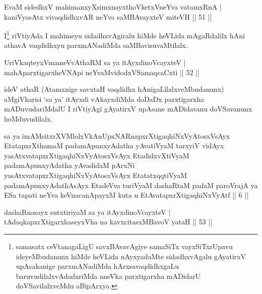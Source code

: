 \begin{shl}
EvaM sidedhxV mahimanxyXsimxnayxthoVketxVneYva vatamxRnA | \\
kaniVyasAtx vivaqdidhxvAR neYva saMBAvayxteV miteVH \hfill ||  51 || 
\end{shl}

\begin{artha} 
I\footnote{samasatx ceVtanagaLigU savxBAvavAgiye samaSiTx 
vayxSiTxrUpavu ideyeMbudanunx hiMde heVLida nAyxyadaMte sidadhxvAgalu 
gAyatirxV upAsakanige parxmANadiMda hArxsavaqdidhxgaLu 
baruvudilalxvAdadxriMda aneVka parxtigarxha mADidarU doVSavilalxveMdu 
aBipArxya.} riVtiyAda I mahimeyu sidadhxvAgiralu hiMde heVLida 
mAgaRdalilx hAni athavA vaqdidhxyu parxmANadiMda saMBavisuvaMtilalx.
\end{artha}


\begin{shl}
UriVkaqteyxVmameVvAthaRM sa ya itAyxdinoVcayxteV | \\
mahAparxtigarxheVNApi neYvaMvidodxVSamaqcaCxti \hfill ||  52 || 
\end{shl}

\begin{artha} 
ideV athaR (Atamxnige savxtaH vaqdidhx hAnigaLilalxveMbudanunx) 
aMgiVkarisi `sa ya' itAyxdi vAkayxdiMda doDaDx parxtigarxha 
mADuvudariMdalU I riVtiyAgi gAyatirxV upAsane mADidavanu doVSavanunx 
hoMduvudilalx. 
\end{artha}

\begin{kandikeshl}
sa ya imAMsitxrXVMlolxVkAnUpxNARnapxrXtigaqhiNxVyAtosxV\s sAyx EtatapxrXthamaM padamApunxyAdatha yAvatiVyaM tarxyiV vidAyx yasAtxvatapxrXtigaqhiNxVyAtosxV\s sAyx EtadidxvXtiVyaM padamApunxyAdatha yAvadidaM pArxNi yasAtxvatapxrXtigaqhiNxVyAtosxV\s sAyx EtatatxqqtiVyaM padamApunxyAdathAsAyx EtadeVva turiVyaM dashaRtaM padaM paroVrajA ya ESa tapati neYva keVnacanApayxM kuta u EtAvatapxrXtigaqhiNxVyAtf || 6 ||
\end{kandikeshl}

\begin{shl}
dashaRnasayx sutxtiriyaM sa ya itAyxdinoVcayxteV | \\
tAdaqkapxrXtigarxhaseyxVha na kavxcitasxMBavoV yataH \hfill ||  53 || 
\end{shl}

